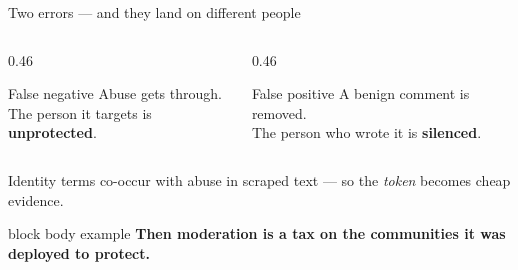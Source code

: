 \documentclass[aspectratio=169,11pt,xcolor={table}]{beamer}
\newcommand{\takeaway}[1]{%
  \vspace{0.6ex}%
  \begin{beamercolorbox}[wd=\textwidth,sep=1.0ex,rounded=true]{block body example}%
    \small\textbf{#1}%
  \end{beamercolorbox}}
\begin{document}
\begin{frame}{Two errors --- and they land on different people}
  \vspace{2.4ex}
  \begin{columns}[t,onlytextwidth]
    \begin{column}{0.46\textwidth}
      \begin{alertblock}{False negative}
        Abuse gets through.\\[0.5ex]
        The person it targets is \textbf{unprotected}.
      \end{alertblock}
    \end{column}
    \begin{column}{0.46\textwidth}
      \begin{block}{False positive}
        A benign comment is removed.\\[0.5ex]
        The person who wrote it is \textbf{silenced}.
      \end{block}
    \end{column}
  \end{columns}

  \vspace{3.0ex}
  \centerline{\small Identity terms co-occur with abuse in scraped text --- so
    the \emph{token} becomes cheap evidence.}

  \takeaway{Then moderation is a tax on the communities it was deployed to
    protect.}
\end{frame}
\end{document}
